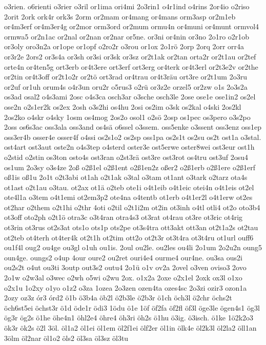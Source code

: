 {o3rien.
o6rienti
o3rier
o3ril
or1ima
ori4mi
2o3rin1
o4r1ind
o4rins
2or4io
o2riso
2orit
2ork
ork4r
ork3s
2orm
or2mam
or4mang
or4mans
orm3asp
or2m1eb
or4m3erf
or4m3er4g
or2mor
orm3ord
or2mum
ormu4n
or4muni
or4munt
ormvol4
ormwa5
or2n1ac
or2nal
or2nan
or2nar
or5ne.
or3ni
or4nin
or3no
2o1ro
o2r1ob
or3oly
oro3n2a
or1ope
or1opf
o2ro2r
o3rou
or1ox
2o1rö
2orp
2orq
2orr
orr4a
or3r2e
2ors2
or3s4a
or3sh
or3si
or3sk
or3sz
or2t1ak
or2tan
orta2r
or2t1au
or2tef
orte4n
or4ten5g
ort3erb
or4t3ere
ort3erf
ort3erg
or4terk
or4t3erl
or2t3e2v
or2the
or2tin
or4t3off
or2t1o2r
or2tö
ort3rad
or4trau
or4t3räu
ort3re
or2t1um
2o3ru
or2uf
or1uh
orum4s
o4r3un
oru2r
o5rus3
o2rü
or3z2e
orzel5
or2zw
o1s
2o3s2a
os3ad
osal2
o4s3ami
2osc
o4s3ca
osch3ar
o3sche
osch3le
2ose
ose1e
ose1in2
os2el
ose2n
o2s1er2k
os2ex
2osh
o3s2hi
os4hu
2osi
os2im
o3sk
os2kal
o4ski
2os2kl
2os2ko
o4skr
o4sky
1osm
os4mog
2os2o
osol1
o2sö
2osp
os1pec
os3pero
o3s2po
2oss
os6s3ac
oss3ala
oss3and
os4sä
o6ssel
o3ssem.
oss5enke
o3ssent
oss3enz
oss1ep
oss3er4b
osser4e
osser4f
o4ssi
os2s1o2
os2sp
oss1pa
os2s1t
os2su
os2t
ost1a
o3stal.
ost4art
ost3aut
oste2n
o4s3tep
o4sterd
oster3e
ost5erwe
oster8wei
ost3eur
ost1h
o2stid
o2stin
os3ton
osto4s
ost3ran
o2st3rä
ost3re
ost3rot
os4tru
ost3uf
2osu4
os1um
2o3sy
o3s4ze
2oß
o2ß1el
o2ß1ent
o2ß1en2z
oßer2
o2ß1erb
o2ß1ere
o2ß1erf
oß1is
oß1u
2o1t
o2t3abi
ot1ah
o2t1ak
o3tal
o3tam
ot1ant
o3tark
o2tarz
ota4s
ot1ast
o2t1au
o3tau.
ot2ax
ot1ä
o2teb
ote1i
o4t1eib
o4t1eic
otei4n
o4t1eis
ot2el
ote4l1a
o3tem
o4t1emi
ot2em3p2
ote4na
o4tentb
ot1erb
o4t1er2l
o4t1erw
ot2es
ot2har
o2them
o2t1hi
o2thr
4oti
o2til
o2t1i2m
ot2in
ot3inh
o4tl
otli4
ot2o
oto3b4
ot3off
oto2ph
o2t1ö
otra3c
o3t4ran
otra4s3
ot3rat
ot4rau
ot3re
ot3ric
ot4rig
ot3rin
ot3rus
ot2s3at
ots1o
ots1p
ots2pe
ot3s4tra
ott3akt
ott3an
ot2t1a2s
ot2tau
ot2teb
ot4terh
ot4ter4k
ot2t1h
ot2tim
ott2o
ot2t3r
ot3t4ra
ot3t4ru
ot1url
ouff6
ou1f4l
oug2
ou4ge
ou3gl
o1uh
ou1is.
2oul
ou2le.
ou2les
ou4li
2o1um
2o2u2n
oung5
oun4ge.
oungs2
o4up
4our
oure2
ou2ret
ouri4e4
ourme4
our4ne.
ou3sa
ous2i
ou2s2t
o4ut
ou3ti
3outp
out3s2
outu4
2o1ü
o1v
ov2a
2ovel
o3ven
oviso3
2ovo
2o1w
o2w3al
o3wec
o2wh
o5wi
o2wu
2ox.
o1x2a
2oxe
o2x1el
2oxk
ox3l
o1xo
o2x1u
1o2xy
o1yo
o1z2
o3za
1ozea
2o3zen
ozen4ta
ozes4sc
2o3zi
ozir3
ozon1a
2ozy
oz3z
ór3
órd2
ö1b
ö3b4a
öb2l
ö2b3le
ö2b3r
ö1ch
öch3l
ö2chr
öchs2t
öch6st5ei
öchst3r
ö1d
öde1r
ödi3
1ödu
ö1e
1öf
öf2fa
öf2fl
öf3l
öge3le
ögen4s1
ög3l
ög3r
ög2s
ö1he
öhe4n1
öhl2e4
öhre4
öh3ri
öh2s
ö1hu
ö3ig.
ö3isch.
ö1ke
1ö2k2o3
ök3r
ök2s
ö2l
3öl.
öl1a2
öl1ei
öl1em
öl2f1ei
ölf2er
öl1in
ölk4e
öl2k3l
öl2la2
öll1an
3ölm
öl2nar
öl1o2
öls2
öl3sa
öl3sz
öl3tu
}

